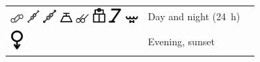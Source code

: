 \documentclass[british,final,landscape]{scrartcl}
\begin{document}
\begin{refsection}
\begin{supertabular}{p{0.3\textwidth}p{0.34\textwidth}p{0.34\textwidth}}
   \includegraphics[width=5mm]{Time/DayNight} \includegraphics[width=5mm]{Time/DayNight2} \includegraphics[width=5mm]{Time/DayNight3} \includegraphics[width=5mm]{Time/DayNight4} \includegraphics[width=5mm]{Time/DayNight5} \includegraphics[width=5mm]{Time/DayNight6} \includegraphics[width=5mm]{Time/DayNight7} \includegraphics[width=5mm]{Time/DayNight8} & Day and night (\SI{24}{h}) & \\
   \includegraphics[width=5mm]{Time/Evening} & Evening, sunset & \\

\end{supertabular}
\end{refsection}
\end{document}
